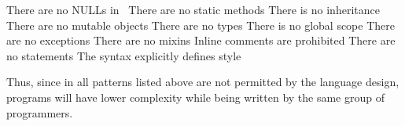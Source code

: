 \begin{itemize}
 There are no NULLs in~\eo{}
 There are no static methods
 There is no inheritance
 There are no mutable objects
 There are no types
 There is no global scope
 There are no exceptions
 There are no mixins
 Inline comments are prohibited
 There are no statements
 The syntax explicitly defines style
\end{itemize}

Thus, since in \eo{} all patterns listed above
are not permitted by the language design, \eo{} programs
will have lower complexity while being written by the same group
of programmers.
